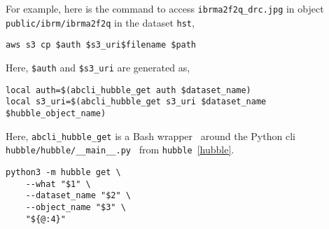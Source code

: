 For example, here is the command to access \texttt{ibrma2f2q_drc.jpg} in object \texttt{public/ibrm/ibrma2f2q} in the dataset \texttt{hst},
%
\begin{verbatim}
aws s3 cp $auth $s3_uri$filename $path
\end{verbatim}
%
Here, \texttt{\$auth} and \texttt{\$s3\_uri} are generated as,
%
\begin{verbatim}
local auth=$(abcli_hubble_get auth $dataset_name)
local s3_uri=$(abcli_hubble_get s3_uri $dataset_name $hubble_object_name)
\end{verbatim}
%
Here, \texttt{abcli_hubble_get} is a Bash wrapper~ around the Python cli \texttt{hubble/hubble/__main__.py}~ from \texttt{hubble}~\ref{hubble}.
%
\begin{verbatim}
python3 -m hubble get \
    --what "$1" \
    --dataset_name "$2" \
    --object_name "$3" \
    "${@:4}"
\end{verbatim}




